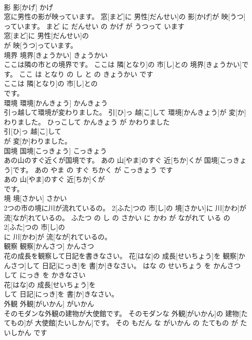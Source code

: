 \documentclass[8pt]{extreport}
\begin{document}
\begin{CJK}{UTF8}{min}
\\	影	影[かげ]	かげ	
\\	窓に男性の影が映っています。	窓[まど]に 男性[だんせい]の 影[かげ]が 映[うつ]っています。	まど に だんせい の かげ が うつって います	
\\	窓[まど]に 男性[だんせい]の
\\	が 映[うつ]っています。			
\\	境界	境界[きょうかい]	きょうかい	
\\	ここは隣の市との境界です。	ここは 隣[となり]の 市[し]との 境界[きょうかい]です。	ここ は となり の し と の きょうかい です	
\\	ここは 隣[となり]の 市[し]との
\\	です。			
\\	環境	環境[かんきょう]	かんきょう	
\\	引っ越して環境が変わりました。	引[ひ]っ 越[こ]して 環境[かんきょう]が 変[か]わりました。	ひっこして かんきょう が かわりました	
\\	引[ひ]っ 越[こ]して
\\	が 変[か]わりました。			
\\	国境	国境[こっきょう]	こっきょう	
\\	あの山のすぐ近くが国境です。	あの 山[やま]のすぐ 近[ちか]くが 国境[こっきょう]です。	あの やま の すぐ ちかく が こっきょう です	
\\	あの 山[やま]のすぐ 近[ちか]くが
\\	です。			
\\	境	境[さかい]	さかい	
\\	2つの市の境に川が流れているの。	2[ふた]つの 市[し]の 境[さかい]に 川[かわ]が 流[なが]れているの。	ふたつ の し の さかい に かわ が ながれて いる の	
\\	2[ふた]つの 市[し]の
\\	に 川[かわ]が 流[なが]れているの。			
\\	観察	観察[かんさつ]	かんさつ	
\\	花の成長を観察して日記を書きなさい。	花[はな]の 成長[せいちょう]を 観察[かんさつ]して 日記[にっき]を 書[か]きなさい。	はな の せいちょう を かんさつ して にっき を かきなさい	
\\	花[はな]の 成長[せいちょう]を
\\	して 日記[にっき]を 書[か]きなさい。			
\\	外観	外観[がいかん]	がいかん	
\\	そのモダンな外観の建物が大使館です。	そのモダンな 外観[がいかん]の 建物[たてもの]が 大使館[たいしかん]です。	その もだん な がいかん の たてもの が たいしかん です	

\end{CJK}
\end{document}
